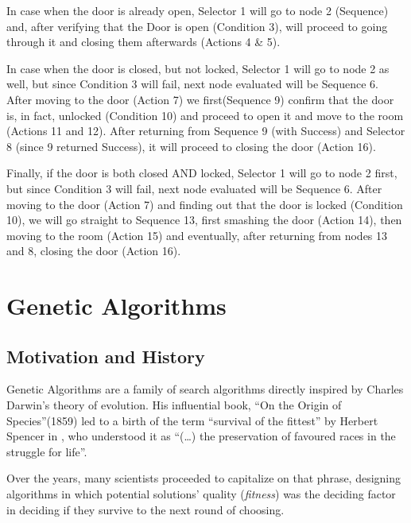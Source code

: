 In case when the door is already open, Selector 1 will go to node 2 (Sequence) and, after verifying that the Door is open (Condition 3), will proceed to going through it and closing them afterwards (Actions 4 \& 5).

In case when the door is closed, but not locked, Selector 1 will go to node 2 as well, but since Condition 3 will fail, next node evaluated will be Sequence 6. After moving to the door (Action 7) we first(Sequence 9) confirm that the door is, in fact, unlocked (Condition 10) and proceed to open it and move to the room (Actions 11 and 12). After returning from Sequence 9 (with Success) and Selector 8 (since 9 returned Success), it will proceed to closing the door (Action 16).

Finally, if the door is both closed AND locked, Selector 1 will go to node 2 first, but since Condition 3 will fail, next node evaluated will be Sequence 6. After moving to the door (Action 7) and finding out that the door is locked (Condition 10), we will go straight to Sequence 13, first smashing the door (Action 14), then moving to the room (Action 15) and eventually, after returning from nodes 13 and 8, closing the door (Action 16).
\section{Genetic Algorithms}
\subsection{Motivation and History}
Genetic Algorithms are a family of search algorithms directly inspired by Charles Darwin's theory of evolution. His influential book, ``On the Origin of Species''(1859) led to a birth of the term ``survival of the fittest'' by Herbert Spencer in \cite{principlesofbiology} , who understood it as \enquote{(\ldots) the preservation of favoured races in the struggle for life}.

Over the years, many scientists proceeded to capitalize on that phrase, designing algorithms in which potential solutions' quality (\textit{fitness}) was the deciding factor in deciding if they survive to the next round of choosing. %

